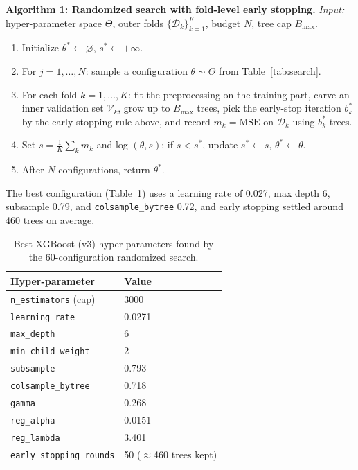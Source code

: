 \documentclass[journal]{IEEEtran}
\begin{document}
\vspace{2pt}
\noindent\textbf{Algorithm 1: Randomized search with fold-level early stopping.}
\emph{Input:} hyper-parameter space $\Theta$, outer folds
$\{\mathcal{D}_k\}_{k=1}^{K}$, budget $N$, tree cap $B_{\max}$.
\begin{enumerate}
\item Initialize $\theta^{*}\leftarrow\varnothing$, $s^{*}\leftarrow+\infty$.
\item For $j=1,\dots,N$: sample a configuration $\theta\sim\Theta$ from
Table~\ref{tab:search}.
\item For each fold $k=1,\dots,K$: fit the preprocessing on the training part,
carve an inner validation set $\mathcal{V}_k$, grow up to $B_{\max}$ trees, pick
the early-stop iteration $b_k^{*}$ by the early-stopping rule above, and record
$m_k=\mathrm{MSE}$ on $\mathcal{D}_k$ using $b_k^{*}$ trees.
\item Set $s=\frac{1}{K}\sum_k m_k$ and log $(\theta,s)$; if $s<s^{*}$, update
$s^{*}\leftarrow s$, $\theta^{*}\leftarrow\theta$.
\item After $N$ configurations, return $\theta^{*}$.
\end{enumerate}
\vspace{2pt}

The best configuration (Table~\ref{tab:xgbparams}) uses a learning rate of
0.027, max depth 6, subsample 0.79, and \texttt{colsample\_bytree} 0.72, and
early stopping settled around 460 trees on average.

\begin{table}[!t]
\caption{Best XGBoost (v3) hyper-parameters found by the 60-configuration
randomized search.}
\label{tab:xgbparams}
\centering
\begin{tabular}{ll}
\toprule
Hyper-parameter & Value \\
\midrule
\texttt{n\_estimators} (cap) & 3000 \\
\texttt{learning\_rate} & 0.0271 \\
\texttt{max\_depth} & 6 \\
\texttt{min\_child\_weight} & 2 \\
\texttt{subsample} & 0.793 \\
\texttt{colsample\_bytree} & 0.718 \\
\texttt{gamma} & 0.268 \\
\texttt{reg\_alpha} & 0.0151 \\
\texttt{reg\_lambda} & 3.401 \\
\texttt{early\_stopping\_rounds} & 50 ($\approx$460 trees kept) \\
\bottomrule
\end{tabular}
\end{table}
\end{document}
